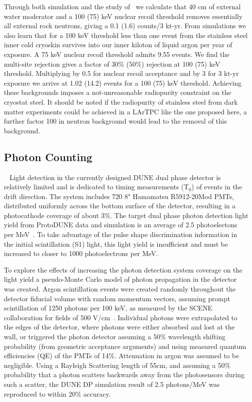 \documentclass[a4paper,11pt]{article}
\begin{document}
Through both simulation and the study of~\cite{beacom_bkd} we calculate that 40 cm of external water moderator and a 100 (75) keV nuclear recoil threshold removes essentially all external rock neutrons, giving a 0.1 (1.6) counts/3 kt-yr. From simulations we also learn that for a 100 keV threshold less than one event from the stainless steel inner cold cryoskin survives into our inner kiloton of liquid argon per year of exposure. A 75 keV nuclear recoil threshold admits 9.55 events. We find the multi-site rejection gives a factor of 30\% (50\%) rejection at 100 (75) keV threshold. Multiplying by 0.5 for nuclear recoil acceptance and by 3 for 3 kt-yr exposure we arrive at 1.02 (14.2) events for a 100 (75) keV threshold. Achieving these backgrounds imposes a not-unreasonable radiopurity constraint on the cryostat steel. It should be noted if the radiopurity of stainless steel from dark matter experiments could be achieved in a LArTPC like the one proposed here, a further factor 100 in neutron background would lead to the removal of this background.

\subsection{Photon Counting}~\label{photoncount}
Light detection in the currently designed DUNE dual phase detector is relatively limited and is dedicated to timing measurements (T$_0$) of 
events in the drift direction. The system includes 720 8" Hamamatsu R5912-20Mod PMTs, distributed uniformly across the bottom surface of the detector, resulting in a photocathode coverage of about 3\%. The target dual phase photon detection light yield from ProtoDUNE data and simulation is an average of 2.5 photoelectons per MeV~\cite{TDR}. To take advantage of the pulse shape discrimination information in the initial scintillation (S1) light, this light yield is insufficient and must be increased to closer to 1000 photoelectrons per MeV.

To explore the effects of increasing the photon detection system coverage on the light yield a pseudo-Monte Carlo model of photon propagation in the detector was created. Argon scintillation events were created randomly throughout the detector fiducial volume with random momentum vectors, assuming prompt scintillation of 1250 photons per 100 keV, as measured by the SCENE collaboration for fields of 500 V/cm~\cite{cao2015measurement, cao2014study}. Individual photons were extrapolated to the edges of the detector, where photons were either absorbed and lost at the wall, or triggered the photon detector assuming a 50\% wavelength shifting probability (from geometric acceptance arguments) and using measured quantum efficiencies (QE) of the PMTs of 14\%. Attenuation in argon was assumed to be negligible. Using a Rayleigh Scattering length of 55cm, and assuming a 50\% probability that a photon scatters backwards away from the photosensors during such a scatter, the DUNE DP simulation result of 2.5 photons/MeV was reproduced to within 20\% accuracy.
\end{document}

